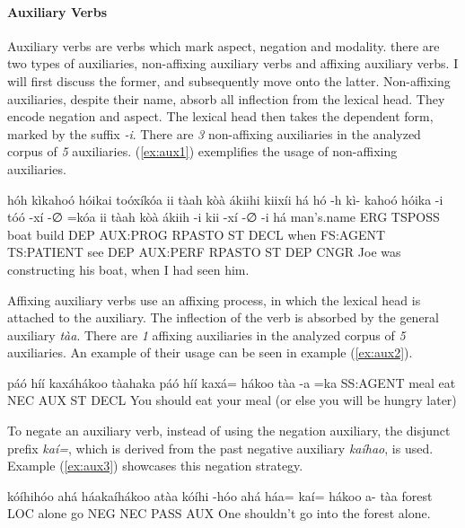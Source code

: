 \documentclass[a4paper, 12pt, oneside]{memoir}
\newcommand{\emh}[1]{\textit{#1}}
\begin{document}
\paragraph{Auxiliary Verbs}
Auxiliary verbs are verbs which mark aspect, negation and modality. there are two types of auxiliaries, non-affixing auxiliary verbs and affixing auxiliary verbs. I will first discuss the former, and subsequently move onto the latter. Non-affixing auxiliaries, despite their name, absorb all inflection from the lexical head. They encode negation and aspect. The lexical head then takes the dependent form, marked by the suffix \emh{-i}. There are \textit{3} non-affixing auxiliaries in the analyzed corpus of \textit{5} auxiliaries. (\ref{ex:aux1}) exemplifies the usage of non-affixing auxiliaries.
\begin{examples}
    \ex \label{ex:aux1}
    \words hóh kìkahoó hóikai toóxíkóa ii tàah kòà ákiihi kiixíi há
    \bits hó -h kì- kahoó hóika -i tóó -xí -∅ =kóa ii tàah kòà ákiih -i kii -xí -∅ -i há
    \gloss man's.name ERG TSPOSS boat build DEP AUX:PROG RPASTO ST DECL when FS:AGENT TS:PATIENT see DEP AUX:PERF RPASTO ST DEP CNGR
    \tr Joe was constructing his boat, when I had seen him.
\end{examples}
Affixing auxiliary verbs use an affixing process, in which the lexical head is attached to the auxiliary. The inflection of the verb is absorbed by the general auxiliary \emh{tàa}. There are \textit{1} affixing auxiliaries in the analyzed corpus of \textit{5} auxiliaries. An example of their usage can be seen in example (\ref{ex:aux2}).
\begin{examples}
    \ex \label{ex:aux2}
    \words páó híí kaxáhákoo tàahaka
    \bits páó híí kaxá= hákoo tàa -a =ka 
    \gloss SS:AGENT meal eat NEC AUX ST DECL
    \tr You should eat your meal (or else you will be hungry later)
\end{examples}
To negate an auxiliary verb, instead of using the negation auxiliary, the disjunct prefix \emh{kaí=}, which is derived from the past negative auxiliary \emh{kaíhao}, is used. Example (\ref{ex:aux3}) showcases this negation strategy.
\begin{examples}
    \ex \label{ex:aux3}
    \words kóíhihóo ahá háakaíhákoo atàa
    \bits kóíhi -hóo ahá háa= kaí= hákoo a- tàa 
    \gloss forest LOC alone go NEG NEC PASS AUX
    \tr One shouldn't go into the forest alone.
\end{examples}
\end{document}
